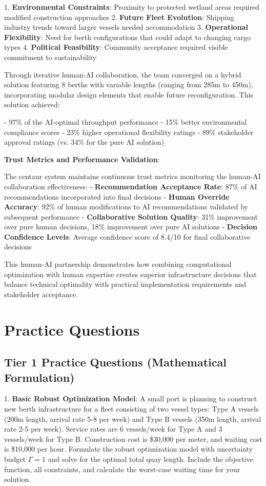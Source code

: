 \documentclass{article}
\begin{document}
1. \textbf{Environmental Constraints}: Proximity to protected wetland areas required modified construction approaches
2. \textbf{Future Fleet Evolution}: Shipping industry trends toward larger vessels needed accommodation
3. \textbf{Operational Flexibility}: Need for berth configurations that could adapt to changing cargo types
4. \textbf{Political Feasibility}: Community acceptance required visible commitment to sustainability

Through iterative human-AI collaboration, the team converged on a hybrid solution featuring 8 berths with variable lengths (ranging from 285m to 450m), incorporating modular design elements that enable future reconfiguration. This solution achieved:

- 97\% of the AI-optimal throughput performance
- 15\% better environmental compliance scores
- 23\% higher operational flexibility ratings
- 89\% stakeholder approval ratings (vs. 34\% for the pure AI solution)

\textbf{Trust Metrics and Performance Validation}:

The centaur system maintains continuous trust metrics monitoring the human-AI collaboration effectiveness:
- \textbf{Recommendation Acceptance Rate}: 87\% of AI recommendations incorporated into final decisions
- \textbf{Human Override Accuracy}: 92\% of human modifications to AI recommendations validated by subsequent performance
- \textbf{Collaborative Solution Quality}: 31\% improvement over pure human decisions, 18\% improvement over pure AI solutions
- \textbf{Decision Confidence Levels}: Average confidence score of 8.4/10 for final collaborative decisions

This human-AI partnership demonstrates how combining computational optimization with human expertise creates superior infrastructure decisions that balance technical optimality with practical implementation requirements and stakeholder acceptance.

\section{Practice Questions}

\subsection{Tier 1 Practice Questions (Mathematical Formulation)}

1. \textbf{Basic Robust Optimization Model}: A small port is planning to construct new berth infrastructure for a fleet consisting of two vessel types: Type A vessels (200m length, arrival rate 5-8 per week) and Type B vessels (350m length, arrival rate 2-5 per week). Service rates are 6 vessels/week for Type A and 3 vessels/week for Type B. Construction cost is \$30,000 per meter, and waiting cost is \$10,000 per hour. Formulate the robust optimization model with uncertainty budget $\Gamma = 1$ and solve for the optimal total quay length. Include the objective function, all constraints, and calculate the worst-case waiting time for your solution.
\end{document}
